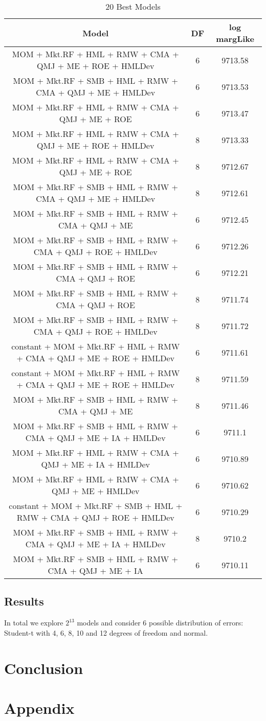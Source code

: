 \documentclass[12pt]{article}
\begin{document}
\begin{table}[ht]
	\footnotesize
	\centering
	\begin{tabular}{ccc}
		\hline
		Model & DF & log margLike \\ 
		\hline
		MOM + Mkt.RF + HML + RMW + CMA + QMJ + ME + ROE + HMLDev & 6 & 9713.58 \\ 
		MOM + Mkt.RF + SMB + HML + RMW + CMA + QMJ + ME + HMLDev & 6 & 9713.53 \\ 
		MOM + Mkt.RF + HML + RMW + CMA + QMJ + ME + ROE & 6 & 9713.47 \\ 
		MOM + Mkt.RF + HML + RMW + CMA + QMJ + ME + ROE + HMLDev & 8 & 9713.33 \\ 
		MOM + Mkt.RF + HML + RMW + CMA + QMJ + ME + ROE & 8 & 9712.67 \\ 
		MOM + Mkt.RF + SMB + HML + RMW + CMA + QMJ + ME + HMLDev & 8 & 9712.61 \\ 
		MOM + Mkt.RF + SMB + HML + RMW + CMA + QMJ + ME & 6 & 9712.45 \\ 
		MOM + Mkt.RF + SMB + HML + RMW + CMA + QMJ + ROE + HMLDev & 6 & 9712.26 \\ 
		MOM + Mkt.RF + SMB + HML + RMW + CMA + QMJ + ROE & 6 & 9712.21 \\ 
		MOM + Mkt.RF + SMB + HML + RMW + CMA + QMJ + ROE & 8 & 9711.74 \\ 
		MOM + Mkt.RF + SMB + HML + RMW + CMA + QMJ + ROE + HMLDev & 8 & 9711.72 \\ 
		constant + MOM + Mkt.RF + HML + RMW + CMA + QMJ + ME + ROE + HMLDev & 6 & 9711.61 \\ 
		constant + MOM + Mkt.RF + HML + RMW + CMA + QMJ + ME + ROE + HMLDev & 8 & 9711.59 \\ 
		MOM + Mkt.RF + SMB + HML + RMW + CMA + QMJ + ME & 8 & 9711.46 \\ 
		MOM + Mkt.RF + SMB + HML + RMW + CMA + QMJ + ME + IA + HMLDev & 6 & 9711.1 \\ 
		MOM + Mkt.RF + HML + RMW + CMA + QMJ + ME + IA + HMLDev & 6 & 9710.89 \\ 
		MOM + Mkt.RF + HML + RMW + CMA + QMJ + ME + HMLDev & 6 & 9710.62 \\ 
		constant + MOM + Mkt.RF + SMB + HML + RMW + CMA + QMJ + ROE + HMLDev & 6 & 9710.29 \\ 
		MOM + Mkt.RF + SMB + HML + RMW + CMA + QMJ + ME + IA + HMLDev & 8 & 9710.2 \\ 
		MOM + Mkt.RF + SMB + HML + RMW + CMA + QMJ + ME + IA & 6 & 9710.11 \\ 
		\hline
	\end{tabular}
		\caption{20 Best Models}
\end{table}
\subsection{Results}
In total we explore $2^{13}$ models and consider 6 possible distribution of errors: Student-t with 4, 6, 8, 10 and 12 degrees of freedom and normal. 
\section{Conclusion}

\section{Appendix}
\end{document}
